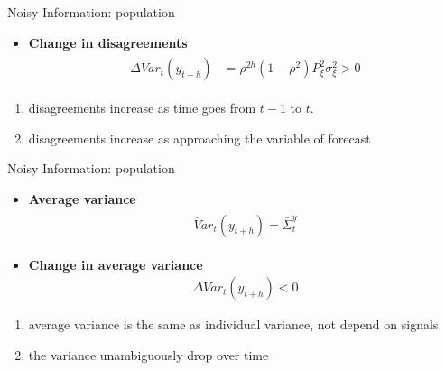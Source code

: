 \documentclass{beamer}
\begin{document}
\begin{frame}{Noisy Information: population}
\begin{itemize}
\item \textbf{Change in disagreements}
\begin{eqnarray*}
\begin{aligned}
\Delta Var_t(y_{t+h}) & = \rho^{2h}(1-\rho^2) P^2_\xi \sigma^2_\xi >0
\end{aligned}
\end{eqnarray*}
\end{itemize}

\begin{enumerate}
	\item disagreements increase as time goes from $t-1$ to $t$. 
	\item disagreements increase as approaching the variable of forecast
\end{enumerate}

\end{frame}


\begin{frame}{Noisy Information: population}
\begin{itemize}
\item \textbf{Average variance}
\begin{eqnarray*}
\begin{aligned}
\bar Var_t (y_{t+h}) = \bar \Sigma^y_t
\end{aligned}
\end{eqnarray*}
\item \textbf{Change in average variance}
\begin{eqnarray*}
\Delta Var_t(y_{t+h}) < 0 
\end{eqnarray*}

\end{itemize}

\begin{enumerate}
	\item average variance is the same as individual variance, not depend on signals
	\item the variance unambiguously drop over time 
\end{enumerate}

\end{frame}
\end{document}
